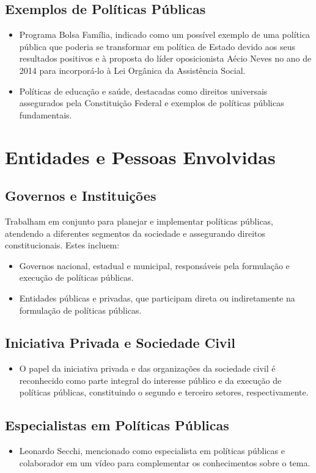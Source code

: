 \documentclass[
   article,       
   12pt,          
   oneside,       
   a4paper,       
   english,       
   brazil,        
   sumario=tradicional
   ]{abntex2}
\begin{document}
\subsection{Exemplos de Políticas Públicas}
\begin{itemize}
    \item Programa Bolsa Família, indicado como um possível exemplo de uma política pública que poderia se transformar em política de Estado devido aos seus resultados positivos e à proposta do líder oposicionista Aécio Neves no ano de 2014 para incorporá-lo à Lei Orgânica da Assistência Social.
    \item Políticas de educação e saúde, destacadas como direitos universais assegurados pela Constituição Federal e exemplos de políticas públicas fundamentais.
\end{itemize}

\section{Entidades e Pessoas Envolvidas}
\subsection{Governos e Instituições}
Trabalham em conjunto para planejar e implementar políticas públicas, atendendo a diferentes segmentos da sociedade e assegurando direitos constitucionais. Estes incluem:
\begin{itemize}
    \item Governos nacional, estadual e municipal, responsáveis pela formulação e execução de políticas públicas.
    \item Entidades públicas e privadas, que participam direta ou indiretamente na formulação de políticas públicas.
\end{itemize}

\subsection{Iniciativa Privada e Sociedade Civil}
\begin{itemize}
    \item O papel da iniciativa privada e das organizações da sociedade civil é reconhecido como parte integral do interesse público e da execução de políticas públicas, constituindo o segundo e terceiro setores, respectivamente.
\end{itemize}

\subsection{Especialistas em Políticas Públicas}
\begin{itemize}
    \item Leonardo Secchi, mencionado como especialista em políticas públicas e colaborador em um vídeo para complementar os conhecimentos sobre o tema.
\end{itemize}
\end{document}

